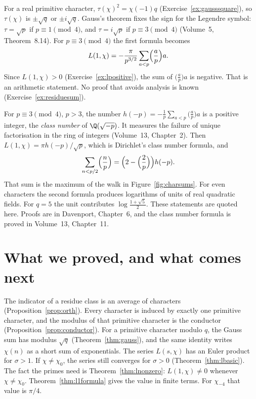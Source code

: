 For a real primitive character, $\tau(\chi)^2=\chi(-1)q$ (Exercise~\ref{ex:gausssquare}), so $\tau(\chi)$ is $\pm\sqrt q$ or $\pm i\sqrt q$. Gauss's theorem fixes the sign for the Legendre symbol: $\tau=\sqrt p$ if $p\equiv1\pmod4$, and $\tau=i\sqrt p$ if $p\equiv3\pmod4$ (Volume~5, Theorem~8.14). For $p\equiv3\pmod4$ the first formula becomes
\[
L(1,\chi)=-\frac\pi{p^{3/2}}\sum_{a<p}\Bigl(\frac ap\Bigr)a.
\]
Since $L(1,\chi)>0$ (Exercise~\ref{ex:lpositive}), the sum of $\bigl(\frac ap\bigr)a$ is negative. That is an arithmetic statement. No proof that avoids analysis is known (Exercise~\ref{ex:residuesum}).

\begin{remark}
For $p\equiv3\pmod4$, $p>3$, the number $h(-p)=-\frac1p\sum_{a<p}\bigl(\frac ap\bigr)a$ is a positive integer, the \emph{class number} of $\Q(\sqrt{-p})$. It measures the failure of unique factorisation in the ring of integers (Volume~13, Chapter~2). Then $L(1,\chi)=\pi h(-p)/\sqrt p$, which is Dirichlet's class number formula, and
\[
\sum_{n<p/2}\Bigl(\frac np\Bigr)=\Bigl(2-\Bigl(\frac2p\Bigr)\Bigr)h(-p).
\]
That sum is the maximum of the walk in Figure~\ref{fig:charsums}. For even characters the second formula produces logarithms of units of real quadratic fields. For $q=5$ the unit contributes $\log\frac{1+\sqrt5}2$. These statements are quoted here. Proofs are in Davenport, Chapter~6, and the class number formula is proved in Volume~13, Chapter~11.
\end{remark}

\section{What we proved, and what comes next}

The indicator of a residue class is an average of characters (Proposition~\ref{prop:orth}). Every character is induced by exactly one primitive character, and the modulus of that primitive character is the conductor (Proposition~\ref{prop:conductor}). For a primitive character modulo $q$, the Gauss sum has modulus $\sqrt q$ (Theorem~\ref{thm:gauss}), and the same identity writes $\chi(n)$ as a short sum of exponentials. The series $L(s,\chi)$ has an Euler product for $\sigma>1$. If $\chi\ne\chi_0$, the series still converges for $\sigma>0$ (Theorem~\ref{thm:lbasic}). The fact the primes need is Theorem~\ref{thm:lnonzero}: $L(1,\chi)\ne0$ whenever $\chi\ne\chi_0$. Theorem~\ref{thm:l1formula} gives the value in finite terms. For $\chi_{-4}$ that value is $\pi/4$.

